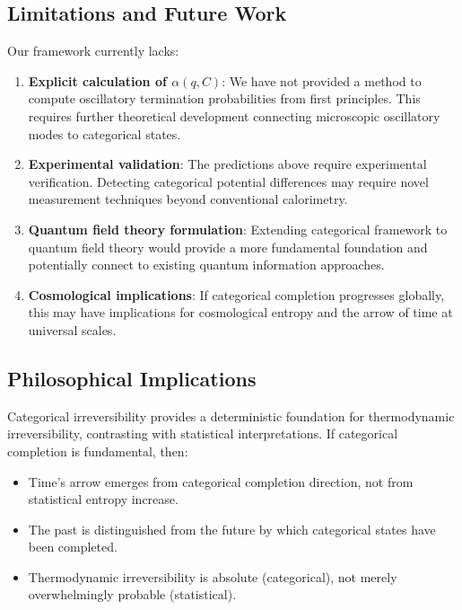 \documentclass[12pt,a4paper]{article}
\theoremstyle{remark}
\begin{document}
\subsection{Limitations and Future Work}

Our framework currently lacks:

\begin{enumerate}
\item \textbf{Explicit calculation of $\alpha(q, C)$}: We have not provided a method to compute oscillatory termination probabilities from first principles. This requires further theoretical development connecting microscopic oscillatory modes to categorical states.

\item \textbf{Experimental validation}: The predictions above require experimental verification. Detecting categorical potential differences may require novel measurement techniques beyond conventional calorimetry.

\item \textbf{Quantum field theory formulation}: Extending categorical framework to quantum field theory would provide a more fundamental foundation and potentially connect to existing quantum information approaches.

\item \textbf{Cosmological implications}: If categorical completion progresses globally, this may have implications for cosmological entropy and the arrow of time at universal scales.
\end{enumerate}

\subsection{Philosophical Implications}

Categorical irreversibility provides a deterministic foundation for thermodynamic irreversibility, contrasting with statistical interpretations. If categorical completion is fundamental, then:

\begin{itemize}
\item Time's arrow emerges from categorical completion direction, not from statistical entropy increase.
\item The past is distinguished from the future by which categorical states have been completed.
\item Thermodynamic irreversibility is absolute (categorical), not merely overwhelmingly probable (statistical).
\end{itemize}
\end{document}
